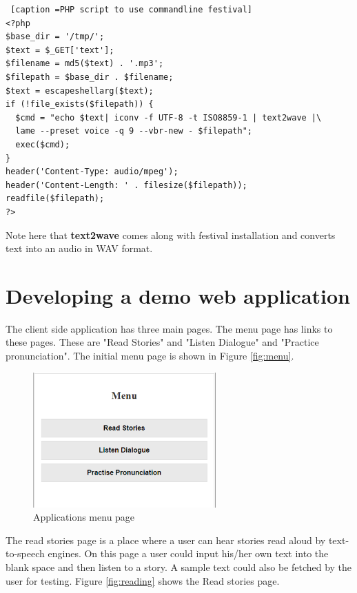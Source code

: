 \documentclass[11pt,a4paper,oneside,article]{memoir}
\begin{document}
\lstset{language=php}
\begin{minipage}{\linewidth}
\begin{lstlisting} [caption =PHP script to use commandline festival]
<?php
$base_dir = '/tmp/';
$text = $_GET['text'];
$filename = md5($text) . '.mp3';
$filepath = $base_dir . $filename;
$text = escapeshellarg($text);
if (!file_exists($filepath)) {
  $cmd = "echo $text| iconv -f UTF-8 -t ISO8859-1 | text2wave |\
  lame --preset voice -q 9 --vbr-new - $filepath";
  exec($cmd);
}
header('Content-Type: audio/mpeg');
header('Content-Length: ' . filesize($filepath));
readfile($filepath);
?>
\end{lstlisting}
\end{minipage}

Note here that \textbf{text2wave} comes along with festival installation and converts text into an audio in WAV format.

\section{Developing a demo web application}
The client side application has three main pages. The menu page has links to these pages. These are "Read Stories" and "Listen Dialogue" and "Practice pronunciation". The initial menu page is shown in Figure  \vref{fig:menu}.
\begin{figure}[!h]
\includegraphics[width=7cm]{menu}
\caption{Applications menu page}
\label{fig:menu}
\end{figure}

The read stories page is a place where a user can hear stories read aloud by text-to-speech engines. On this page a user could input his/her own text into the blank space and then listen to a story. A sample text could also be fetched by the user for testing. Figure  \vref{fig:reading} shows the Read stories page.
\end{document}
